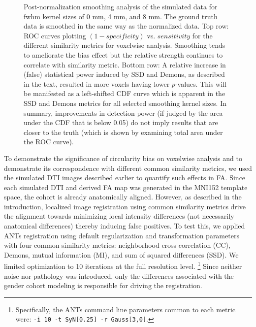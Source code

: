 \documentclass[final,5p,times,twocolumn]{elsarticle}
\begin{document}
\begin{figure}
\begin{center}
\begin{tabular}{ccc}
\end{tabular}
\caption{Post-normalization smoothing analysis of the simulated data for
fwhm kernel sizes of 0 mm, 4 mm, and 8 mm.  The ground truth data is
smoothed in the same way as the normalized data.  Top row:  
ROC curves plotting $(1 - specificity)$ vs. $sensitivity$ for the
different similarity metrics for voxelwise analysis.  Smoothing
tends to ameliorate the bias effect but the relative strength
continues to correlate with similarity metric.  Bottom row:
A relative 
increase in (false) statistical power induced by SSD and Demons, as 
described in the text, resulted in more voxels having lower 
$p$-values.  This will be manifested as a left-shifted CDF 
curve which is apparent in the SSD and Demons metrics for all selected
smoothing kernel sizes.  In summary, improvements in detection power
(if judged by the area under the CDF that is below 0.05) do not imply results that are closer to the
truth (which is shown by examining total area under the ROC curve).
}
\label{fig:simulated_plots_smooth}
\end{center}        
\end{figure}





To demonstrate the significance of circularity bias on voxelwise 
analysis and to demonstrate its correspondence with different
common similarity metrics, we used the simulated DTI images 
described earlier to quantify such effects in FA.
Since each simulated DTI and derived FA map was generated in the
MNI152 template space, the cohort is already anatomically
aligned.  However, as described in the introduction, localized
image registration using common similarity metrics drive the 
alignment towards minimizing local intensity differences (not necessarily
anatomical differences) thereby
inducing false positives.  To test this, we applied ANTs registration
using default regularization and transformation parameters with
four common similarity metrics:  neighborhood cross-correlation (CC), 
Demons, mutual information (MI), and sum of squared differences (SSD).
We limited optimization to 10 iterations at the full resolution 
level.%
\footnote{
Specifically, the ANTs command line parameters common to each metric were:
{\tt -i 10 -t SyN[0.25] -r Gauss[3,0]}.
}
Since neither noise nor pathology was introduced, only the differences
associated with the gender cohort modeling is responsible for driving
the registration.
\end{document}
